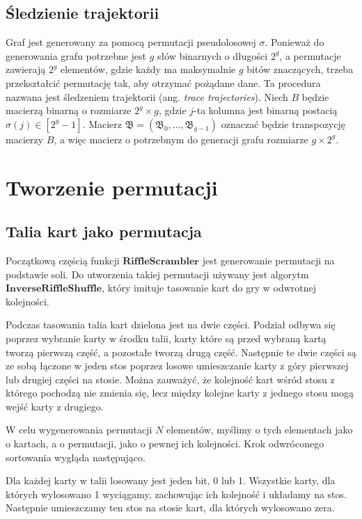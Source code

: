 \subsection{Śledzienie trajektorii}
Graf jest generowany za pomocą permutacji pseudolosowej $\sigma$.
Ponieważ do generowania grafu potrzebne jest $g$ słów binarnych o długości $2^{g}$, a permutacje zawierają $2^{g}$ elementów, gdzie każdy ma maksymalnie $g$ bitów znaczących, trzeba przekształcić permutację tak, aby otrzymać pożądane dane.
Ta procedura nazwana jest śledzeniem trajektorii (ang. \textit{trace trajectories}).
Niech $B$ będzie macierzą binarną o rozmiarze $2^{g} \times g$, gdzie $j$-ta kolumna jest binarną postacią $\sigma(j) \in [2^{g}-1]$. Macierz $\mathfrak{B} = (\mathfrak{B}_{0},\dots,\mathfrak{B}_{g-1})$ oznaczać będzie transpozycję macierzy $B$, a więc macierz o potrzebnym do generacji grafu rozmiarze $g \times 2^{g}$.


\section{Tworzenie permutacji}

\subsection{Talia kart jako permutacja}
Początkową częścią funkcji $\mathbf{RiffleScrambler}$ jest generowanie permutacji na podstawie soli. Do utworzenia takiej permutacji używany jest algorytm $\mathbf{InverseRiffleShuffle}$, który imituje tasowanie kart do gry w odwrotnej kolejności.

Podczas tasowania talia kart dzielona jest na dwie części.
Podział odbywa się poprzez wybranie karty w środku talii, karty które są przed wybraną kartą tworzą pierwszą część, a pozostałe tworzą drugą część.
Następnie te dwie części są ze sobą łączone w jeden stos poprzez losowe umieszczanie karty z góry pierwszej lub drugiej części na stosie.
Można zauważyć, że kolejność kart wśród stosu z którego pochodzą nie zmienia się, lecz między kolejne karty z jednego stosu mogą wejść karty z drugiego.

W celu wygenerowania permutacji $N$ elementów, myślimy o tych elementach jako o kartach, a o permutacji, jako o pewnej ich kolejności.
Krok odwróconego sortowania wygląda następująco.

Dla każdej karty w talii losowany jest jeden bit, 0 lub 1. Wszystkie karty, dla których wylosowano 1 wyciągamy, zachowując ich kolejność i układamy na stos. Następnie umieszczamy ten stos na stosie kart, dla których wylosowano zera.

